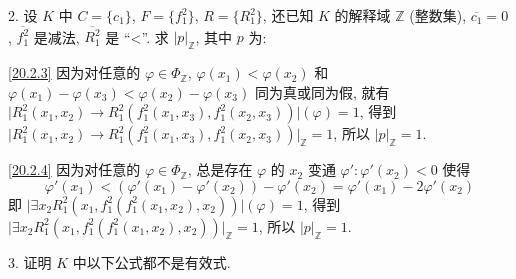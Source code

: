 \documentclass[boxes]{homework}
\begin{document}
\begin{problem}
2. 设 $K$ 中 $C = \{c_1\}$, $F=\{f_1^2\}$, $R=\{R_1^2\}$, 还已知 $K$ 的解释域 $\mathbb{Z}$ (整数集), $\overline{c_1} = 0$, $\overline{f_1^2}$ 是减法, $\overline{R_1^2}$ 是 ``<''. 求 $\lvert p\rvert_\mathbb{Z}$, 其中 $p$ 为:
\end{problem}
\begin{solution}
    \ref{20.2.3} 因为对任意的 $\varphi\in \Phi_\mathbb{Z}$, $\varphi(x_1) < \varphi(x_2)$ 和 $\varphi(x_1) - \varphi(x_3) < \varphi(x_2) - \varphi(x_3)$ 同为真或同为假, 就有
    $\lvert R_1^2(x_1, x_2)\to R_1^2(f_1^2(x_1, x_3), f_1^2(x_2, x_3))\rvert(\varphi) = 1$,
    得到 $\lvert R_1^2(x_1, x_2)\to R_1^2(f_1^2(x_1, x_3), f_1^2(x_2, x_3))\rvert_\mathbb{Z} = 1$, 所以 $\lvert p\rvert_\mathbb{Z} = 1$.

    \ref{20.2.4} 因为对任意的 $\varphi\in \Phi_\mathbb{Z}$, 总是存在 $\varphi$ 的 $x_2$ 变通 $\varphi': \varphi'(x_2) < 0$ 使得
    $$
        \varphi'(x_1) < (\varphi'(x_1) - \varphi'(x_2)) - \varphi'(x_2) = \varphi'(x_1) - 2\varphi'(x_2)
    $$
    即 $\lvert \exists x_2 R_1^2 (x_1, f_1^2(f_1^2(x_1, x_2), x_2))\rvert(\varphi) = 1$, 得到
    $\lvert \exists x_2 R_1^2 (x_1, f_1^2(f_1^2(x_1, x_2), x_2))\rvert_\mathbb{Z} = 1$, 所以 $\lvert p\rvert_\mathbb{Z} = 1$.
\end{solution}
\begin{problem}
3. 证明 $K$ 中以下公式都不是有效式.
\end{problem}
\end{document}
